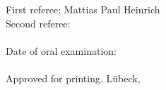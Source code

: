 \begin{titlepage}
    \addtolength{\topmargin}{18cm}
    \noindent First referee: Mattias Paul Heinrich\\
    Second referee:\\\\
    Date of oral examination:\\\\
    Approved for printing. Lübeck,
\end{titlepage}